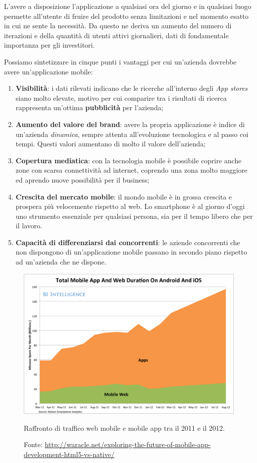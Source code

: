 L'avere a disposizione l'applicazione a qualsiasi ora del giorno e in qualsiasi luogo permette all'utente di fruire del prodotto senza limitazioni e nel momento esatto in cui ne sente la necessità. Da questo ne deriva un aumento del numero di iterazioni e della quantità di utenti attivi giornalieri, dati di fondamentale importanza per gli investitori.

Possiamo sintetizzare in cinque punti i vantaggi per cui un'azienda dovrebbe avere un'applicazione mobile:

\begin{enumerate}

\item \textbf{Visibilità}: i dati rilevati indicano che le ricerche all'interno degli \textit{App stores} siano molto elevate, motivo per cui comparire tra i risultati di ricerca rappresenta un'ottima \textbf{pubblicità} per l'azienda;
\item \textbf{Aumento del valore del brand}: avere la propria applicazione è indice di un'azienda \textit{dinamica}, sempre attenta all'evoluzione tecnologica e al passo coi tempi. Questi valori aumentano di molto il valore dell'azienda;
\item \textbf{Copertura mediatica}: con la tecnologia mobile è possibile coprire anche zone con scarsa connettività ad internet, coprendo una zona molto maggiore ed aprendo nuove possibilità per il business;
\item \textbf{Crescita del mercato mobile}: il mondo mobile è in grossa crescita e prospera più velocemente rispetto al web. Lo smartphone è al giorno d'oggi uno strumento essenziale per qualsiasi persona, sia per il tempo libero che per il lavoro.
\item \textbf{Capacità di differenziarsi dai concorrenti}: le aziende concorrenti che non dispongono di un'applicazione mobile passano in secondo piano rispetto ad un'azienda che ne dispone.

\end{enumerate}

\begin{figure}[htpd]
\centering
\includegraphics[width=\textwidth]{../immagini/mobile-and-web-market}
\caption{Raffronto di traffico web mobile e mobile app tra il 2011 e il 2012.}  
\caption*{Fonte: \url{http://waracle.net/exploring-the-future-of-mobile-app-development-html5-vs-native/}}
\end{figure}

